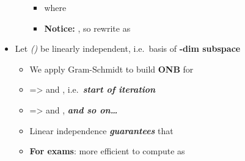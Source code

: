\begin{itemize}
\begin{itemize}
    \begin{itemize}
    
    \item
      where
    \item
      \textbf{Notice:}
      ,
      so rewrite as
    \end{itemize}
  \end{itemize}
\item
  Let 
  \emph{()} be linearly independent, i.e.~basis of
  \textbf{-dim subspace}

  \begin{itemize}
  
  \item
    We apply Gram-Schmidt to build \textbf{ONB}
    for 
  \item
     =\textgreater{}
     and
    ,
    i.e.~\textbf{\emph{start of iteration}}
  \item
     =\textgreater{}
    and ,
    \textbf{\emph{and so on\ldots{}}}
  \item
    Linear independence \textbf{\emph{guarantees}} that
  \item
    \textbf{For exams}: more efficient to compute as

    \begin{enumerate}
    \def\labelenumi{\arabic{enumi})}
    

\end{enumerate}
\end{itemize}
\end{itemize}
